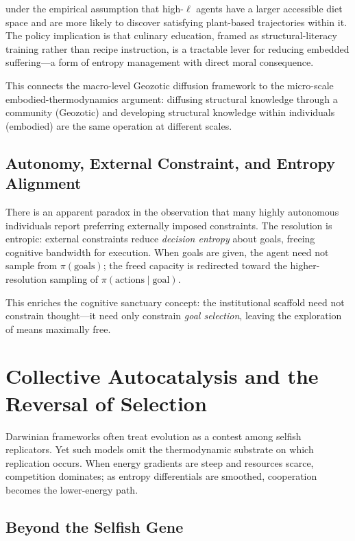 \documentclass[12pt,a4paper]{article}
\theoremstyle{definition}
\begin{document}
under the empirical assumption that high-$\ell$ agents have a larger
accessible diet space and are more likely to discover satisfying plant-based
trajectories within it.  The policy implication is that culinary education,
framed as structural-literacy training rather than recipe instruction, is a
tractable lever for reducing embedded suffering---a form of entropy
management with direct moral consequence.

This connects the macro-level Geozotic diffusion framework to the micro-scale
embodied-thermodynamics argument: diffusing structural knowledge through a
community (Geozotic) and developing structural knowledge within individuals
(embodied) are the same operation at different scales.

\subsection{Autonomy, External Constraint, and Entropy Alignment}

There is an apparent paradox in the observation that many highly autonomous
individuals report preferring externally imposed constraints.  The resolution
is entropic: external constraints reduce \emph{decision entropy} about goals,
freeing cognitive bandwidth for execution.  When goals are given, the agent
need not sample from $\pi(\text{goals})$; the freed capacity is redirected
toward the higher-resolution sampling of $\pi(\text{actions} \mid \text{goal})$.

This enriches the cognitive sanctuary concept: the institutional scaffold need
not constrain thought---it need only constrain \emph{goal selection}, leaving
the exploration of means maximally free.

\section{Collective Autocatalysis and the Reversal of Selection}
\label{sec:autocatalysis}

Darwinian frameworks often treat evolution as a contest among selfish
replicators.  Yet such models omit the thermodynamic substrate on which
replication occurs.  When energy gradients are steep and resources scarce,
competition dominates; as entropy differentials are smoothed, cooperation
becomes the lower-energy path.

\subsection{Beyond the Selfish Gene}
\end{document}
